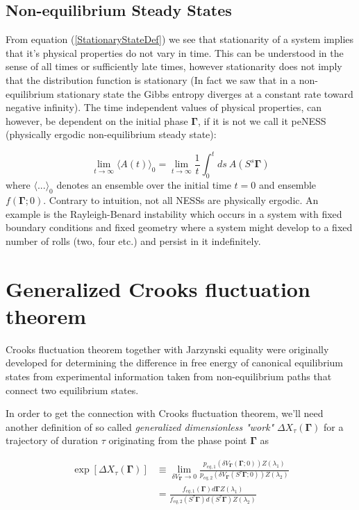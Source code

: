 \documentclass[a4paper,12pt]{article}
\begin{document}
\subsection{Non-equilibrium Steady States}

From equation (\ref{StationaryStateDef}) we see that stationarity of a system implies that it's physical properties do not vary in time. This can be understood in the sense of all times or sufficiently late times, however stationarity does not imply that the distribution function is stationary (In fact we saw that in a non-equilibrium stationary state the Gibbs entropy diverges at a constant rate toward negative infinity).
The time independent values of physical properties, can however, be dependent on the initial phase $\bm{\Gamma}$, if it is not we call it peNESS (physically ergodic non-equilibrium steady state):

\begin{equation}
      \lim_{t \to \infty} \langle A(t) \rangle_0 = \lim_{t \to \infty} \frac{1}{t} \int_0^t ds\ A(S^s \bm{\Gamma})
\end{equation}
 where $\langle ... \rangle_0$ denotes an ensemble over the initial time $t=0$ and ensemble $f(\bm{\Gamma};0)$.
Contrary to intuition, not all NESSs are physically ergodic. An example is the Rayleigh-Benard instability which occurs in a system with fixed boundary conditions and fixed geometry where a system might develop to a fixed number of rolls (two, four etc.) and persist in it indefinitely.
\section{Generalized Crooks fluctuation theorem}

Crooks fluctuation theorem together with Jarzynski equality were originally developed for determining the difference in free energy of canonical equilibrium states from experimental information taken from non-equilibrium paths that connect two equilibrium states. 

In order to get the connection with Crooks fluctuation theorem, we'll need another definition of so called \textit{generalized dimensionless "work"} $\Delta X_{\tau}(\bm{\Gamma})$ for a trajectory of duration $\tau$ originating from the phase point $\bm{\Gamma}$ as

\begin{equation}
\begin{aligned}
\label{GeneralizedWorkDef}
  \exp[\Delta X_{\tau}(\bm{\Gamma})] &\equiv \lim_{\delta V_{\bm{\Gamma}} \to 0} \frac{p_{eq,1} (\delta V_{\bm{\Gamma}}(\bm{\Gamma};0))Z(\lambda_1)}{p_{eq,2} (\delta V_{\bm{\Gamma}}(S^{\tau}\bm{\Gamma};0))Z(\lambda_2)} \\
  &= \frac{f_{eq,1}(\bm{\Gamma}) d\bm{\Gamma} Z(\lambda_1)}{f_{eq,2}(S^{\tau}\bm{\Gamma}) d(S^{\tau}\bm{\Gamma}) Z(\lambda_2)}
\end{aligned}
\end{equation}
\end{document}
